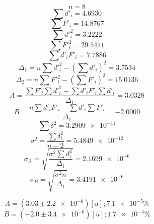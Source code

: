 \documentclass[letter,11pt]{article}
\begin{document}
\begin{equation*}
    n = 8
\end{equation*}
\begin{equation*}
    \sum d'_i = 4.6930
\end{equation*}
\begin{equation*}
    \sum F'_i = 14.8767
\end{equation*}
\begin{equation*}
    \sum d'^2_i = 3.2222
\end{equation*}
\begin{equation*}
    \sum F'^2_i = 29.5411
\end{equation*}
\begin{equation*}
    \sum d'_i F'_i = 7.7886
\end{equation*}
\begin{equation*}
    \Delta_1 = n \sum d'^2_i - \left( \sum d'_i \right)^2 = 3.7534
\end{equation*}
\begin{equation*}
    \Delta_2 = n \sum F'^2_i - \left( \sum F'_i \right)^2 = 15.0136
\end{equation*}
\begin{equation*}
    A = \frac{\sum F'_i \sum d'^2_i - \sum d'_i F'_i \sum d'_i}{\Delta_1} = 3.0328
\end{equation*}
\begin{equation*}
    B = \frac{n \sum d'_i F'_i - \sum d'_i \sum F'_i}{\Delta_1} = -2.0000
\end{equation*}
\begin{equation*}
    \sum \delta^2 = \num{3.2909e-11}
\end{equation*}
\begin{equation*}
    \sigma^2 = \frac{\sum \delta^2_i}{n-2} = \num{5.4849e-12}
\end{equation*}
\begin{equation*}
    \sigma_A = \sqrt{\frac{\sigma^2 \sum d^2_i}{\Delta_1}} = \num{2.1699e-6}
\end{equation*}
\begin{equation*}
    \sigma_B = \sqrt{\frac{\sigma^2 n}{\Delta_1}} = \num{3.4191e-6}
\end{equation*}

\begin{equation*}
    A = (3.03 \pm \num{2.2e-6})[u]; \num{7.1e-5}\%
\end{equation*}
\begin{equation*}
    B = (-2.0 \pm \num{3.4e-6})[u]; \num{1.7e-4}\%
\end{equation*}
\end{document}
